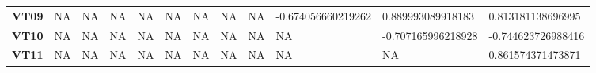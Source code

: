 \documentclass{article}
\begin{document}
\begin{table}[]
\begin{tabular}{llllllllllll}
\textbf{VT09} & NA                & NA                & NA                 & NA                 & NA                 & NA                 & NA                 & NA                 & -0.674056660219262 & 0.889993089918183  & 0.813181138696995  \\
\textbf{VT10} & NA                & NA                & NA                 & NA                 & NA                 & NA                 & NA                 & NA                 & NA                 & -0.707165996218928 & -0.744623726988416 \\
\textbf{VT11} & NA                & NA                & NA                 & NA                 & NA                 & NA                 & NA                 & NA                 & NA                 & NA                 & 0.861574371473871 
\end{tabular}
\end{table}
\end{document}
